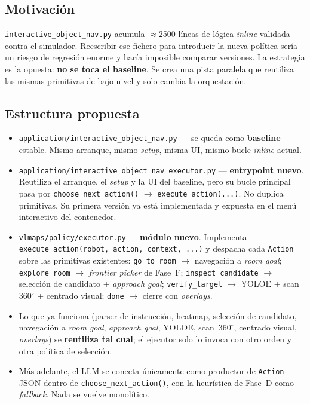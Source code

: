 \documentclass[11pt,a4paper]{article}
\begin{document}
\subsection*{Motivación}

\texttt{interactive\_object\_nav.py} acumula $\approx$2500 líneas de
lógica \emph{inline} validada contra el simulador. Reescribir ese fichero
para introducir la nueva política sería un riesgo de regresión enorme y
haría imposible comparar versiones. La estrategia es la opuesta:
\textbf{no se toca el baseline}. Se crea una pista paralela que reutiliza
las mismas primitivas de bajo nivel y solo cambia la orquestación.

\subsection*{Estructura propuesta}

\begin{itemize}
  \item \texttt{application/interactive\_object\_nav.py} --- se queda como
        \textbf{baseline} estable. Mismo arranque, mismo \emph{setup},
        misma UI, mismo bucle \emph{inline} actual.
  \item \texttt{application/interactive\_object\_nav\_executor.py} ---
        \textbf{entrypoint nuevo}. Reutiliza el arranque, el \emph{setup}
        y la UI del baseline, pero su bucle principal pasa por
        \texttt{choose\_next\_action()} $\rightarrow$
        \texttt{execute\_action(...)}. No duplica primitivas. Su primera
        versión ya está implementada y expuesta en el menú interactivo del
        contenedor.
  \item \texttt{vlmaps/policy/executor.py} --- \textbf{módulo nuevo}.
        Implementa \texttt{execute\_action(robot, action, context, ...)} y
        despacha cada \texttt{Action} sobre las primitivas existentes:
        \texttt{go\_to\_room} $\rightarrow$ navegación a \emph{room goal};
        \texttt{explore\_room} $\rightarrow$ \textit{frontier picker} de
        Fase~F; \texttt{inspect\_candidate} $\rightarrow$ selección de
        candidato + \emph{approach goal}; \texttt{verify\_target}
        $\rightarrow$ YOLOE + scan~$360^\circ$ + centrado visual;
        \texttt{done} $\rightarrow$ cierre con \emph{overlays}.
  \item Lo que ya funciona (parser de instrucción, heatmap, selección de
        candidato, navegación a \emph{room goal}, \emph{approach goal},
        YOLOE, scan~$360^\circ$, centrado visual, \textit{overlays}) se
        \textbf{reutiliza tal cual}; el ejecutor solo lo invoca con otro
        orden y otra política de selección.
  \item Más adelante, el LLM se conecta únicamente como productor de
        \texttt{Action} JSON dentro de \texttt{choose\_next\_action()},
        con la heurística de Fase~D como \emph{fallback}. Nada se vuelve
        monolítico.
\end{itemize}
\end{document}
